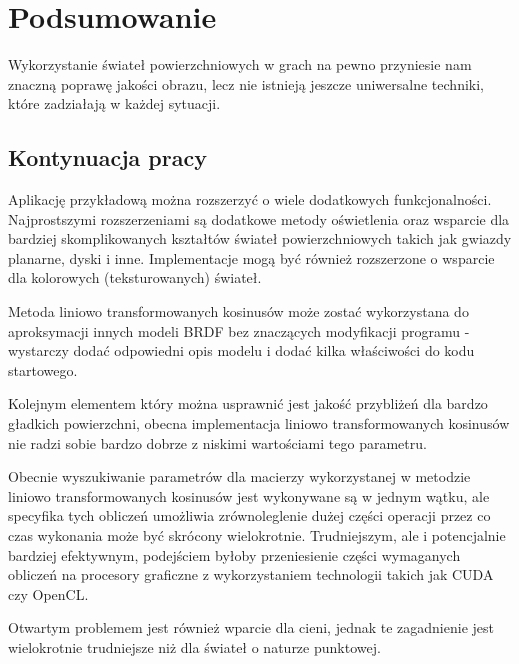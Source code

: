 \documentclass[../main.tex]{subfiles}
\begin{document}
\chapter{Podsumowanie}

Wykorzystanie świateł powierzchniowych w grach na pewno przyniesie nam znaczną poprawę jakości obrazu, lecz nie istnieją jeszcze uniwersalne techniki, które zadziałają w każdej sytuacji. 

\section{Kontynuacja pracy}

Aplikację przykładową można rozszerzyć o wiele dodatkowych funkcjonalności. Najprostszymi rozszerzeniami są dodatkowe metody oświetlenia oraz wsparcie dla bardziej skomplikowanych kształtów świateł powierzchniowych takich jak gwiazdy planarne, dyski i inne. Implementacje mogą być również rozszerzone o wsparcie dla kolorowych (teksturowanych) świateł.

Metoda liniowo transformowanych kosinusów może zostać wykorzystana do aproksymacji innych modeli BRDF bez znaczących modyfikacji programu - wystarczy dodać odpowiedni opis modelu i dodać kilka właściwości do kodu startowego.

Kolejnym elementem który można usprawnić jest jakość przybliżeń dla bardzo gładkich powierzchni, obecna implementacja liniowo transformowanych kosinusów nie radzi sobie bardzo dobrze z niskimi wartościami tego parametru.

Obecnie wyszukiwanie parametrów dla macierzy wykorzystanej w metodzie liniowo transformowanych kosinusów jest wykonywane są w jednym wątku, ale specyfika tych obliczeń umożliwia zrównoleglenie dużej części operacji przez co czas wykonania może być skrócony wielokrotnie. Trudniejszym, ale i potencjalnie bardziej efektywnym, podejściem byłoby przeniesienie części wymaganych obliczeń na procesory graficzne z wykorzystaniem technologii takich jak CUDA czy OpenCL.

Otwartym problemem jest również wparcie dla cieni, jednak te zagadnienie jest wielokrotnie trudniejsze niż dla świateł o naturze punktowej.
\end{document}
